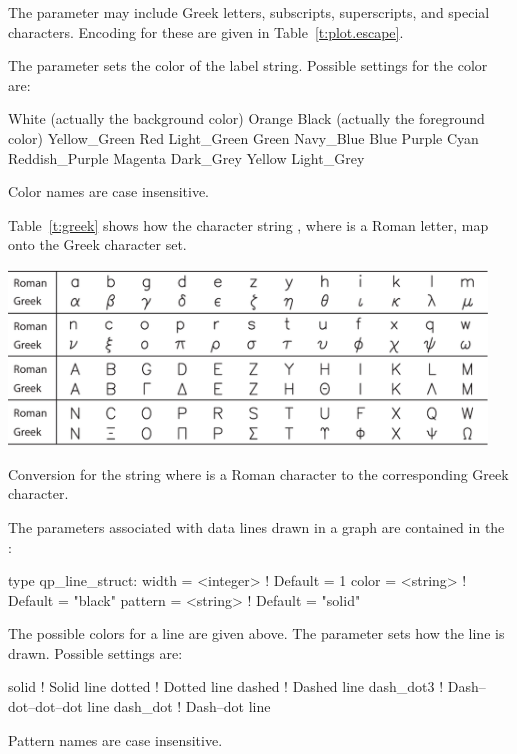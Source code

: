 {The  parameter may include Greek letters, subscripts, superscripts, and special characters.
Encoding for these are given in Table~\ref{t:plot.escape}. 

The  parameter sets the color of the label string. Possible settings for the color are:
\begin{example}
  White   (actually the background color)       Orange          
  Black   (actually the foreground color)       Yellow_Green    
  Red                                           Light_Green         
  Green                                         Navy_Blue       
  Blue                                          Purple          
  Cyan                                          Reddish_Purple  
  Magenta                                       Dark_Grey        
  Yellow                                        Light_Grey       
\end{example}
Color names are case insensitive.

Table~\ref{t:greek} shows how the character string , where  
is a Roman letter, map onto the Greek character set.
\begin{table}
  \centering
  \includegraphics[width=5.0in]{greek.pdf}
  \caption[Roman to Greek Character Conversion]{Conversion for the string 
 where  is a Roman character to the corresponding 
Greek character.}
\label{t:greek}
\end{table}

The parameters associated with data lines drawn in a graph are contained in the :
\begin{example}
  type qp_line_struct:
    width          = <integer>  ! Default = 1
    color          = <string>   ! Default = "black"
    pattern        = <string>   ! Default = "solid"
\end{example}

The possible colors for a line are given above. The  parameter sets how the line is
drawn. Possible settings are:
\begin{example}
  solid      ! Solid line                 dotted     ! Dotted line             
  dashed     ! Dashed line                dash_dot3  ! Dash--dot--dot--dot line
  dash_dot   ! Dash--dot line
\end{example}
Pattern names are case insensitive.

}
